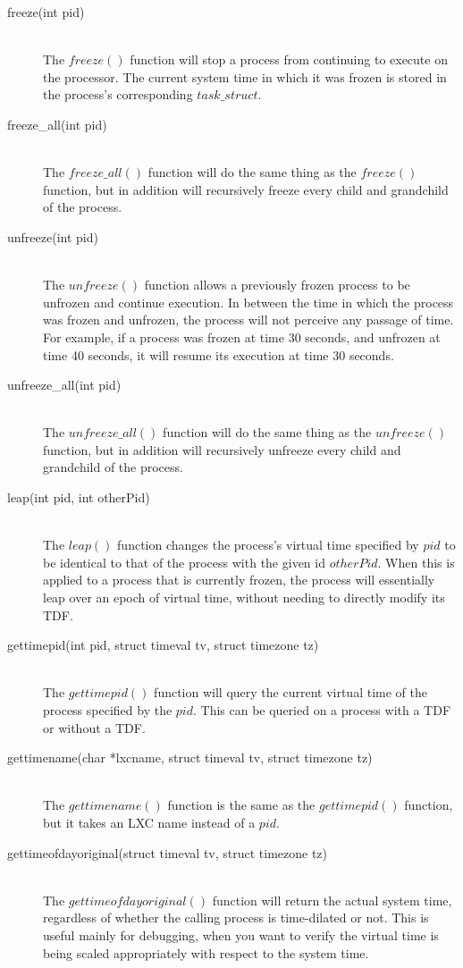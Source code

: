 \begin{description}
 \item[freeze(int pid)] \hfill \\
The $freeze()$ function will stop a process from continuing to execute on the processor. The current system time in which it was frozen is stored in the process's corresponding $task\_struct$.
\item[freeze\_all(int pid) ] \hfill \\
The $freeze\_all()$ function will do the same thing as the $freeze()$ function, but in addition will recursively freeze every child and grandchild of the process. 
 \item[unfreeze(int pid) ] \hfill \\
The $unfreeze()$ function allows a previously frozen process to be unfrozen and continue execution. In between the time in which the process was frozen and unfrozen, the process will not perceive any passage of time. For example, if a process was frozen at time 30 seconds, and unfrozen at time 40 seconds, it will resume its execution at time 30 seconds. 
\item[unfreeze\_all(int pid) ] \hfill \\
The $unfreeze\_all()$ function will do the same thing as the $unfreeze()$ function, but in addition will recursively unfreeze every child and grandchild of the process. 
\item[leap(int pid, int otherPid) ] \hfill \\
The $leap()$ function changes the process's virtual time specified by $pid$ to be identical to that of the process with the given id $otherPid$. When this is applied to a process that is currently frozen, the process will essentially leap over an epoch of virtual time, without needing to directly modify its TDF. 
\item[gettimepid(int pid, struct timeval tv, struct timezone tz) ] \hfill \\
The $gettimepid()$ function will query the current virtual time of the process specified by the $pid$. This can be queried on a process with a TDF or without a TDF.
\item[gettimename(char *lxcname, struct timeval tv, struct timezone tz) ] \hfill \\
The $gettimename()$ function is the same as the $gettimepid()$ function, but it takes an LXC name instead of a $pid$. 
\item[gettimeofdayoriginal(struct timeval tv, struct timezone tz) ] \hfill \\
The $gettimeofdayoriginal()$ function will return the actual system time, regardless of whether the calling process is time-dilated or not. This is useful mainly for debugging, when you want to verify the virtual time is being scaled appropriately with respect to the system time.
\end{description}
